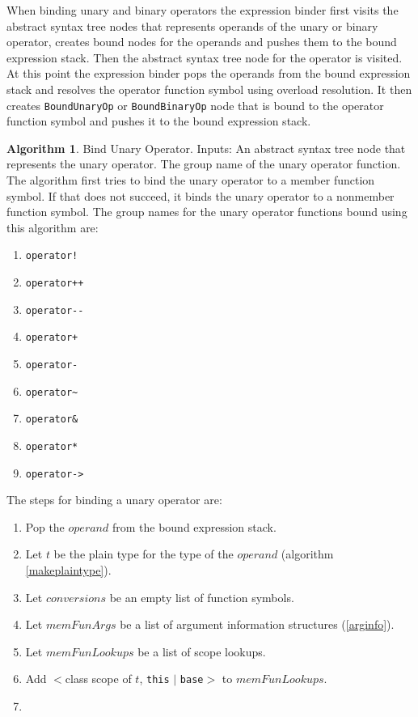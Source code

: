 \documentclass[a4paper,oneside,11pt]{book}
\theoremstyle{definition}
\newtheorem{algo}{Algorithm}[section]
\begin{document}
When binding unary and binary operators the expression binder first visits the abstract syntax tree nodes that represents operands of the unary or binary operator,
creates bound nodes for the operands and pushes them to the bound expression stack. Then the abstract syntax tree node for the operator is visited.
At this point the expression binder pops the operands from the bound expression stack and resolves the operator function symbol using overload resolution.
It then creates \verb|BoundUnaryOp| or \verb|BoundBinaryOp| node that is bound to the operator function symbol and pushes it to the bound expression stack.

\begin{algo}\label{bindunaryop} Bind Unary Operator.
Inputs: An abstract syntax tree node that represents the unary operator. The group name of the unary operator function.
The algorithm first tries to bind the unary operator to a member function symbol.
If that does not succeed, it binds the unary operator to a nonmember function symbol.
The group names for the unary operator functions bound using this algorithm are:
\begin{enumerate}
\item
\verb|operator!|
\item
\verb|operator++|
\item
\verb|operator--|
\item
\verb|operator+|
\item
\verb|operator-|
\item
\verb|operator~|
\item
\verb|operator&|
\item
\verb|operator*|
\item
\verb|operator->|
\end{enumerate}
The steps for binding a unary operator are:
\begin{enumerate}
\item
Pop the $operand$ from the bound expression stack.
\item
Let $t$ be the plain type for the type of the $operand$ (algorithm \ref{makeplaintype}).
\item
Let $conversions$ be an empty list of function symbols.
\item
Let $memFunArgs$ be a list of argument information structures (\ref{arginfo}).
\item
Let $memFunLookups$ be a list of scope lookups.
\item
Add $<$class scope of $t$, \verb|this| $|$ \verb|base|$>$ to $memFunLookups$.
\item

\end{enumerate}
\end{algo}
\end{document}
